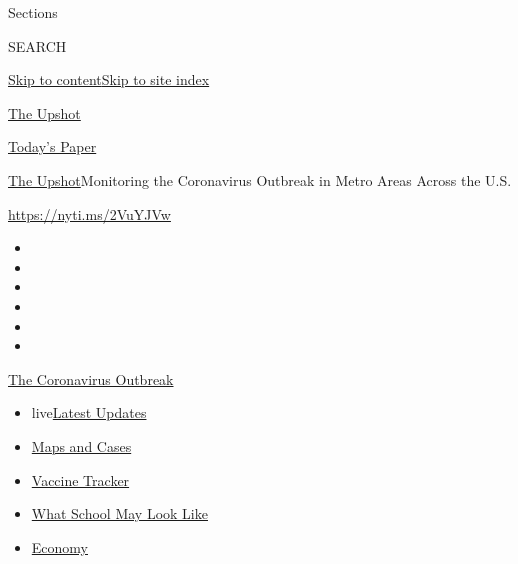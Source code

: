 Sections

SEARCH

\protect\hyperlink{site-content}{Skip to
content}\protect\hyperlink{site-index}{Skip to site index}

\href{https://www.nytimes.com/section/upshot}{The Upshot}

\href{https://myaccount.nytimes.com/auth/login?response_type=cookie\&client_id=vi}{}

\href{https://www.nytimes.com/section/todayspaper}{Today's Paper}

\href{/section/upshot}{The Upshot}\textbar{}Monitoring the Coronavirus
Outbreak in Metro Areas Across the U.S.

\url{https://nyti.ms/2VuYJVw}

\begin{itemize}
\item
\item
\item
\item
\item
\item
\end{itemize}

\href{https://www.nytimes.com/news-event/coronavirus?action=click\&pgtype=Article\&state=default\&region=TOP_BANNER\&context=storylines_menu}{The
Coronavirus Outbreak}

\begin{itemize}
\tightlist
\item
  live\href{https://www.nytimes.com/2020/08/01/world/coronavirus-covid-19.html?action=click\&pgtype=Article\&state=default\&region=TOP_BANNER\&context=storylines_menu}{Latest
  Updates}
\item
  \href{https://www.nytimes.com/interactive/2020/us/coronavirus-us-cases.html?action=click\&pgtype=Article\&state=default\&region=TOP_BANNER\&context=storylines_menu}{Maps
  and Cases}
\item
  \href{https://www.nytimes.com/interactive/2020/science/coronavirus-vaccine-tracker.html?action=click\&pgtype=Article\&state=default\&region=TOP_BANNER\&context=storylines_menu}{Vaccine
  Tracker}
\item
  \href{https://www.nytimes.com/interactive/2020/07/29/us/schools-reopening-coronavirus.html?action=click\&pgtype=Article\&state=default\&region=TOP_BANNER\&context=storylines_menu}{What
  School May Look Like}
\item
  \href{https://www.nytimes.com/live/2020/07/31/business/stock-market-today-coronavirus?action=click\&pgtype=Article\&state=default\&region=TOP_BANNER\&context=storylines_menu}{Economy}
\end{itemize}

